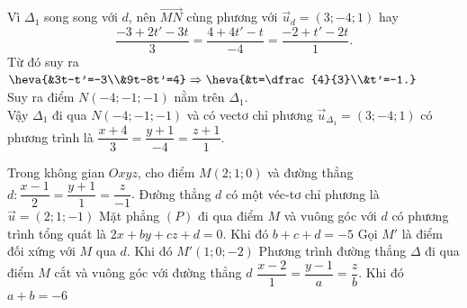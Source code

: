\begin{ex}
{\begin{itemchoice}
			Vì $\Delta_1$  song song với $d$, nên $\overrightarrow{MN}$ cùng phương với $\overrightarrow{u}_d=(3;-4;1)$ hay
			$$\dfrac{-3+2t'-3t}{3}=\dfrac{4+4t'-t}{-4}=\dfrac{-2+t'-2t}{1}.$$ 
			 Từ đó suy ra $\heva{&3t-t'=-3\\&9t-8t'=4}\Rightarrow \heva{&t=\dfrac{4}{3}\\&t'=-1.}$\\
			Suy ra điểm $N(-4;-1;-1)$  nằm trên $\Delta_1$.\\
			Vậy $\Delta_1$ đi qua $N(-4;-1;-1)$ và có vectơ chỉ phương $\overrightarrow{u}_{\Delta_1}=(3;-4;1)$  có phương trình là $ \dfrac{x+4}{3}=\dfrac{y+1}{-4}=\dfrac{z+1}{1}$.
		\end{itemchoice}
	 }
\end{ex}

\begin{ex}%
	Trong  không gian $Oxyz$, cho điểm $M(2;1;0)$ và đường thẳng\\ $d\colon \dfrac{x-1}{2}=\dfrac{y+1}{1}=\dfrac{z}{-1}$.
	\choiceTF 
		{\True Đường thẳng $d$ có một véc-tơ  chỉ phương là $\overrightarrow{u}=(2;1;-1)$}
		{\True Mặt phẳng $(P)$ đi qua điểm $M$ và vuông góc với  $d$ có phương trình tổng quát là $2x+by+cz+d=0$. Khi đó $b+c+d=-5$}
		{Gọi $M'$ là điểm đối xứng với $M$ qua $d$. Khi đó  $M'(1;0;-2)$}
		{\True Phương trình đường thẳng $\Delta$ đi qua điểm $M$ cắt và vuông góc với đường thẳng $d$ $\dfrac{x-2}{1}=\dfrac{y-1}{a}=\dfrac{z}{b}$. Khi  đó $a+b=-6$}
\end{ex}
